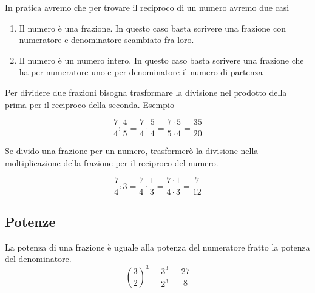 In pratica  avremo che per trovare il reciproco di un numero avremo due casi
\begin{enumerate}
	\item Il numero è una frazione. In questo caso basta scrivere una frazione con numeratore e denominatore scambiato fra loro.
	\item Il numero è un numero intero. In questo caso basta scrivere una frazione che ha per numeratore uno e per denominatore il numero di partenza 
\end{enumerate}

Per dividere due frazioni bisogna trasformare la divisione nel prodotto della prima per il reciproco della seconda. Esempio

\[\dfrac{7}{4}:\dfrac{4}{5}=\dfrac{7}{4}\cdot\dfrac{5}{4}=\dfrac{7\cdot 5}{5\cdot 4}=\dfrac{35}{20}\]

Se divido una frazione per un numero, trasformerò la divisione nella moltiplicazione della frazione per il reciproco del numero.

\[\dfrac{7}{4}:3=\dfrac{7}{4}\cdot\dfrac{1}{3}=\dfrac{7\cdot 1}{4\cdot 3}=\dfrac{7}{12} \]
\subsection{Potenze}

La potenza di una frazione è uguale alla potenza del numeratore fratto la potenza del denominatore.
\[\left( \dfrac{3}{2}\right)^3=\dfrac{3^3}{2^3}=\dfrac{27}{8} \]

